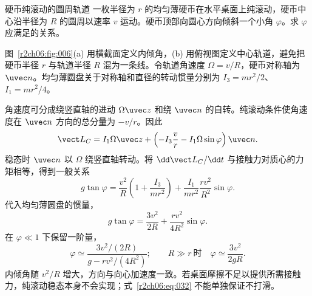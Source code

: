 \begin{practicebox}{硬币纯滚动的圆周轨道}
一枚半径为 $r$ 的均匀薄硬币在水平桌面上纯滚动，硬币中心沿半径为 $R$ 的圆周以速率 $v$ 运动。硬币顶部向圆心方向倾斜一个小角 $\varphi$。求 $\varphi$ 应满足的关系。
\label{r2ch06:pr:004}
\begin{solution}
图~\ref{r2ch06:fig:006}(a) 用横截面定义内倾角，(b) 用俯视图定义中心轨道，避免把硬币半径 $r$ 与轨道半径 $R$ 混为一条线。令轨道角速度 $\Omega=v/R$，硬币对称轴为 $\uvec n$。均匀薄圆盘关于对称轴和直径的转动惯量分别为
$I_3=mr^2/2$、$I_1=mr^2/4$。

角速度可分成绕竖直轴的进动 $\Omega\uvec z$ 和绕 $\uvec n$ 的自转。纯滚动条件使角速度在 $\uvec n$ 方向的总分量为 $-v/r$。因此
\begin{equation}
 \vect L_C=I_1\Omega\uvec z
 +\left(-I_3\frac vr-I_1\Omega\sin\varphi\right)\uvec n.
 \label{r2ch06:eq:029}
\end{equation}
稳态时 $\uvec n$ 以 $\Omega$ 绕竖直轴转动。将 $\dd\vect L_C/\dd t$ 与接触力对质心的力矩相等，得到一般关系
\begin{equation}
 g\tan\varphi
 =\frac{v^2}{R}\left(1+\frac{I_3}{mr^2}\right)
 +\frac{I_1}{mr^2}\frac{rv^2}{R^2}\sin\varphi.
 \label{r2ch06:eq:030}
\end{equation}
代入均匀薄圆盘的惯量，
\begin{equation}
 g\tan\varphi=\frac{3v^2}{2R}+\frac{rv^2}{4R^2}\sin\varphi.
 \label{r2ch06:eq:031}
\end{equation}
在 $\varphi\ll1$ 下保留一阶量，
\begin{equation}
 \boxed{\displaystyle
 \varphi\simeq\frac{3v^2/(2R)}{g-rv^2/(4R^2)}};
 \qquad R\gg r\ \text{时}\quad
 \boxed{\varphi\simeq\frac{3v^2}{2gR}}.
 \label{r2ch06:eq:032}
\end{equation}
内倾角随 $v^2/R$ 增大，方向与向心加速度一致。若桌面摩擦不足以提供所需接触力，纯滚动稳态本身不会实现；式~\eqref{r2ch06:eq:032} 不能单独保证不打滑。
\figRollingCoin
\end{solution}
\end{practicebox}

